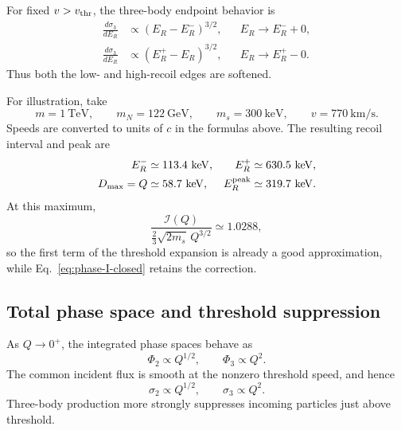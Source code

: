 \documentclass[prd,showpacs,preprintnumbers,amsmath,amssymb,twocolumn,
superscriptaddress,notitlepage]{revtex4-2}
\begin{document}
For fixed $v>v_{\rm thr}$, the three-body endpoint behavior is
\begin{align}
\frac{d\sigma_3}{dE_R}
&\propto(E_R-E_R^-)^{3/2},
&&E_R\to E_R^-+0,\\
\frac{d\sigma_3}{dE_R}
&\propto(E_R^+-E_R)^{3/2},
&&E_R\to E_R^+-0.
\end{align}
Thus both the low- and high-recoil edges are softened.

For illustration, take
\begin{equation}
m=1~\mathrm{TeV},\qquad m_N=122~\mathrm{GeV},\qquad
m_s=300~\mathrm{keV},\qquad v=770~\mathrm{km/s}.
\label{eq:phase-benchmark}
\end{equation}
Speeds are converted to units of $c$ in the formulas above.
The resulting recoil interval and peak are
\begin{align}
E_R^-&\simeq113.4~\mathrm{keV},&
E_R^+&\simeq630.5~\mathrm{keV},\\
D_{\max}=Q&\simeq58.7~\mathrm{keV},&
E_R^{\rm peak}&\simeq319.7~\mathrm{keV}.
\end{align}
At this maximum,
\begin{equation}
\frac{\mathcal{I}(Q)}
     {\frac23\sqrt{2m_s}\,Q^{3/2}}
\simeq1.0288,
\end{equation}
so the first term of the threshold expansion is already a good
approximation, while Eq.~\eqref{eq:phase-I-closed} retains the correction.

\subsection{Total phase space and threshold suppression}

As $Q\to0^+$, the integrated phase spaces behave as
\begin{equation}
\Phi_2\propto Q^{1/2},\qquad
\Phi_3\propto Q^2.
\end{equation}
The common incident flux is smooth at the nonzero threshold speed,
and hence
\begin{equation}
\boxed{
\sigma_2\propto Q^{1/2},\qquad
\sigma_3\propto Q^2.
}
\label{eq:phase-total-powers}
\end{equation}
Three-body production more strongly suppresses incoming particles
just above threshold.
\end{document}
